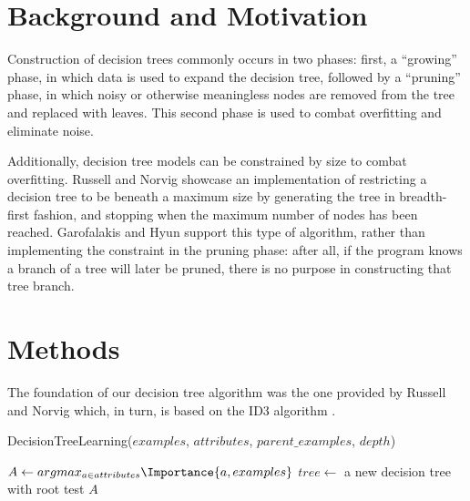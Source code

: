 \documentclass[screen, authorversion, nonacm, sigconf]{acmart}
\begin{document}
\section{Background and Motivation}

Construction of decision trees commonly occurs in two phases: first, a ``growing'' phase, in which data is used to expand the decision tree, followed by a ``pruning'' phase, in which noisy or otherwise meaningless nodes are removed from the tree and replaced with leaves. This second phase is used to combat overfitting and eliminate noise.

Additionally, decision tree models can be constrained by size to combat overfitting. Russell and Norvig \cite{russell_norvig_2010} showcase an implementation of restricting a decision tree to be beneath a maximum size by generating the tree in breadth-first fashion, and stopping when the maximum number of nodes has been reached. Garofalakis and Hyun \cite{Garofalakis:2000:EAC:347090.347163} support this type of algorithm, rather than implementing the constraint in the pruning phase: after all, if the program knows a branch of a tree will later be pruned, there is no purpose in constructing that tree branch.

\section{Methods}

The foundation of our decision tree algorithm was the one provided by Russell and Norvig \cite{russell_norvig_2010} which, in turn, is based on the ID3 algorithm \cite{Quinlan1986}.

\begin{function}
  \caption{DecisionTreeLearning($examples$, $attributes$, $parent\_examples$, $depth$)}
  \label{algo:DecisionTreeLearning}
  $A \gets argmax_{a \in attributes} \Importance{a, examples}$\;
  $tree \gets$ a new decision tree with root test $A$\;
\end{function}
\end{document}
